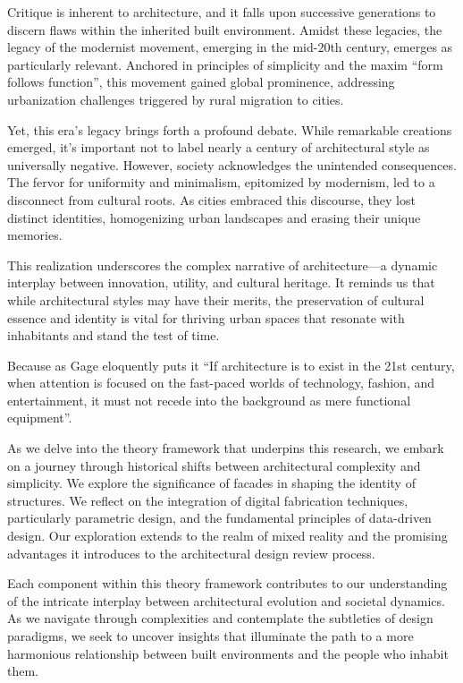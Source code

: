 Critique is inherent to architecture, and it falls upon successive generations to discern flaws within the inherited built environment.
Amidst these legacies, the legacy of the modernist movement, emerging in the mid-20th century, emerges as particularly relevant.
Anchored in principles of simplicity and the maxim ``form follows function'', this movement gained global prominence, addressing urbanization challenges triggered by rural migration to cities.

Yet, this era's legacy brings forth a profound debate.
While remarkable creations emerged, it's important not to label nearly a century of architectural style as universally negative.
However, society acknowledges the unintended consequences.
The fervor for uniformity and minimalism, epitomized by modernism, led to a disconnect from cultural roots.
As cities embraced this discourse, they lost distinct identities, homogenizing urban landscapes and erasing their unique memories.

This realization underscores the complex narrative of architecture—a dynamic interplay between innovation, utility, and cultural heritage.
It reminds us that while architectural styles may have their merits, the preservation of cultural essence and identity is vital for thriving urban spaces that resonate with inhabitants and stand the test of time.

 Because as Gage \cite{Gage2015} eloquently puts it ``If architecture is to exist in the 21st century, when attention is focused on the fast-paced worlds of technology, fashion, and entertainment, it must not recede into the background as mere functional equipment''.

As we delve into the theory framework that underpins this research, we embark on a journey through historical shifts between architectural complexity and simplicity.
We explore the significance of facades in shaping the identity of structures.
We reflect on the integration of digital fabrication techniques, particularly parametric design, and the fundamental principles of data-driven design.
Our exploration extends to the realm of mixed reality and the promising advantages it introduces to the architectural design review process.

Each component within this theory framework contributes to our understanding of the intricate interplay between architectural evolution and societal dynamics.
As we navigate through complexities and contemplate the subtleties of design paradigms, we seek to uncover insights that illuminate the path to a more harmonious relationship between built environments and the people who inhabit them.

